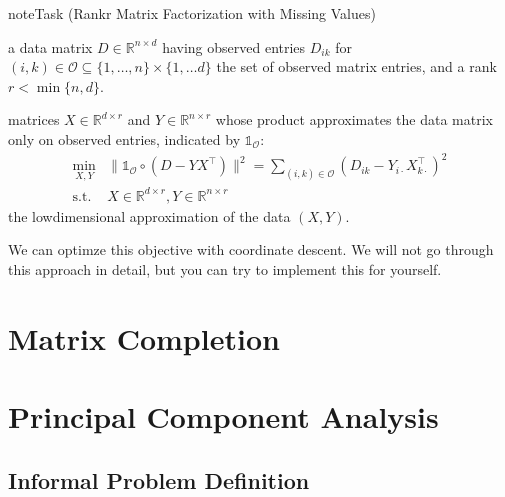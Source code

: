 \documentclass[letterpaper,10pt,english]{jupyterBook}
\begin{document}
\begin{sphinxadmonition}{note}{Task (Rank\sphinxhyphen{}r Matrix Factorization with Missing Values)}

\sphinxAtStartPar
{} a data matrix \(D\in\mathbb{R}^{n\times d}\) having observed entries \(D_{ik}\) for \((i,k)\in\mathcal{O}\subseteq \{1,\ldots,n\}\times \{1,\ldots d\}\) the set of observed matrix entries, and a rank \(r<\min\{n,d\}\).

\sphinxAtStartPar
{} matrices \(X\in\mathbb{R}^{d\times r}\) and \(Y\in\mathbb{R}^{n\times r}\) whose product approximates the data matrix only on observed entries, indicated by \(\mathbb{1}_{\mathcal{O}}\):
\label{equation:dim_reduction_mf:09ace492-0729-4103-b152-bf723dbc6006}\begin{align}
    \min_{X,Y}&\lVert \mathbb{1}_{\mathcal{O}}\circ(D- YX^\top)\rVert^2 =\sum_{(i,k)\in\mathcal{O}}(D_{ik}-Y_{i\cdot}X_{k\cdot}^\top)^2\\ 
    \text{s.t. }& X\in \mathbb{R}^{d\times r}, Y\in\mathbb{R}^{n\times r}
\end{align}
\sphinxAtStartPar
{} the low\sphinxhyphen{}dimensional approximation of the data \((X,Y)\).
\end{sphinxadmonition}

\sphinxAtStartPar
We can optimze this objective with coordinate descent. We will not go through this approach in detail, but you can try to implement this for yourself.

\sphinxstepscope


\section{Matrix Completion}
\label{\detokenize{dim_reduction_matrix_completion:matrix-completion}}\label{\detokenize{dim_reduction_matrix_completion::doc}}
\sphinxstepscope


\section{Principal Component Analysis}
\label{\detokenize{dim_reduction_pca:principal-component-analysis}}\label{\detokenize{dim_reduction_pca::doc}}

\subsection{Informal Problem Definition}
\label{\detokenize{dim_reduction_pca:informal-problem-definition}}
\end{document}

